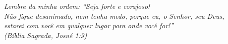 \documentclass[
	12pt,				%
	openright,			%
	twoside,			%
	a4paper,			%
	english,			%
	spanish,			%
	brazil,				%
	]{abntex2}
\begin{document}

\newpage
\begin{epigrafe}
    \vspace*{\fill}
	\begin{flushright}
		\textit{
		Lembre da minha ordem: ``Seja forte e corajoso!
		\\ Não fique desanimado, nem tenha medo, porque eu, o Senhor, seu Deus,
		\\ estarei com você em  qualquer lugar para onde você for!''
		\\ (Bíblia Sagrada, Josué 1:9)}
	\end{flushright}
\end{epigrafe}
\newpage


\end{document}
